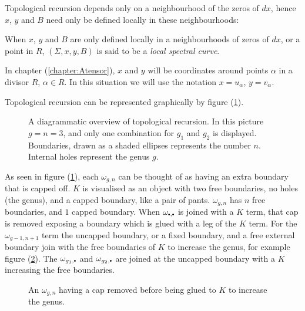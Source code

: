     
    Topological recursion depends only on a neighbourhood of the zeros of \(dx\), hence \(x\), \(y\) and \(B\) need only be defined locally in these neighbourhoods:
    \begin{defn}
    \label{defn:localspectral}
    When \(x\), \(y\) and \(B\) are only defined locally in a neighbourhoods of zeros of \(dx\), or a point in \(R\), \((\Sigma,x,y,B)\) is  said to be a \emph{local spectral curve}.
    \end{defn}
    In chapter (\ref{chapter:Atensor}), \(x\) and \(y\) will be coordinates around points \(\alpha\) in a divisor \(R\), \( \alpha \in R\). In this situation we will use the notation \( x = u_{\alpha}\), \(y= v_{\alpha}\).

    
    Topological recursion can be represented graphically by figure (\ref{fig:tr}).
    \begin{figure}[!htb]
        \centering 
        
        \caption{A diagrammatic overview of topological recursion. In this picture \(g=n=3\), and only one combination for \(g_1\) and \(g_2\) is displayed. Boundaries, drawn as a shaded ellipses represents the number \(n\). Internal holes represent the genus \(g\). }
        \label{fig:tr}
    \end{figure}
    As seen in figure (\ref{fig:tr}), each \( \omega_{g,n}\) can be thought of as having an extra boundary that is capped off. \( K\) is visualised as an object with two free boundaries, no holes (the genus), and a capped boundary, like a pair of pants. \( \omega_{g,n}\) has \(n\) free boundaries, and \(1\) capped boundary. When \( \omega_{\sbt,\sbt}\) is joined with a \(K\) term, that cap is removed exposing a boundary which is glued with a leg of the \(K\) term. For the \( \omega_{g-1,n+1}\) term the uncapped boundary, or a fixed boundary, and a free external boundary join with the free boundaries of \(K\) to increase the genus, for example figure (\ref{fig:trcut}). The \( \omega_{g_1, \sbt}\) and \( \omega_{g_2,\sbt}\) are joined at the uncapped boundary with a \(K\) increasing the free boundaries.
    \begin{figure}[!htb]
        \centering 
        
        \caption{An \( \omega_{g,n}\) having a cap removed before being glued to \(K\) to increase the genus.}
        \label{fig:trcut}
    \end{figure}
    
